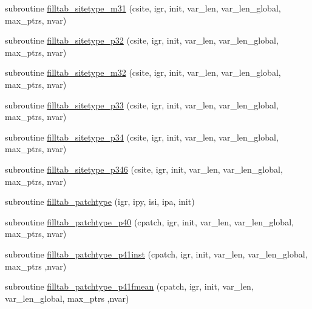 \begin{DoxyCompactItemize}
\item 
subroutine \hyperlink{namespaceed__state__vars_aeda801ceb00e5700d0dc3175a0937d16}{filltab\+\_\+sitetype\+\_\+m31} (csite, igr, init, var\+\_\+len, var\+\_\+len\+\_\+global, max\+\_\+ptrs, nvar)
\item 
subroutine \hyperlink{namespaceed__state__vars_a42452cec3810c62dd8c72e2d58476bcd}{filltab\+\_\+sitetype\+\_\+p32} (csite, igr, init, var\+\_\+len, var\+\_\+len\+\_\+global, max\+\_\+ptrs, nvar)
\item 
subroutine \hyperlink{namespaceed__state__vars_a6f5ed492902141d24d2bd008dd7b68c1}{filltab\+\_\+sitetype\+\_\+m32} (csite, igr, init, var\+\_\+len, var\+\_\+len\+\_\+global, max\+\_\+ptrs, nvar)
\item 
subroutine \hyperlink{namespaceed__state__vars_ae53d37359e4395c526fd65a95f76c428}{filltab\+\_\+sitetype\+\_\+p33} (csite, igr, init, var\+\_\+len, var\+\_\+len\+\_\+global, max\+\_\+ptrs, nvar)
\item 
subroutine \hyperlink{namespaceed__state__vars_acf64db19aff9106beb2c20eecbe6afa9}{filltab\+\_\+sitetype\+\_\+p34} (csite, igr, init, var\+\_\+len, var\+\_\+len\+\_\+global, max\+\_\+ptrs, nvar)
\item 
subroutine \hyperlink{namespaceed__state__vars_ad66c156887d39c17d4cb4b0895e5fe24}{filltab\+\_\+sitetype\+\_\+p346} (csite, igr, init, var\+\_\+len, var\+\_\+len\+\_\+global, max\+\_\+ptrs, nvar)
\item 
subroutine \hyperlink{namespaceed__state__vars_ac37a860383b752e5263aa945c99824a9}{filltab\+\_\+patchtype} (igr, ipy, isi, ipa, init)
\item 
subroutine \hyperlink{namespaceed__state__vars_a83c0921d462c47a37c8d6f97dbdb9d72}{filltab\+\_\+patchtype\+\_\+p40} (cpatch, igr, init, var\+\_\+len, var\+\_\+len\+\_\+global, max\+\_\+ptrs, nvar)
\item 
subroutine \hyperlink{namespaceed__state__vars_aaabc9ebf2bd84a36b30887405edca948}{filltab\+\_\+patchtype\+\_\+p41inst} (cpatch, igr, init, var\+\_\+len, var\+\_\+len\+\_\+global, max\+\_\+ptrs                                                                                                                                                                   ,nvar)
\item 
subroutine \hyperlink{namespaceed__state__vars_a308bf007a232ca65383f36dd6fbd0084}{filltab\+\_\+patchtype\+\_\+p41fmean} (cpatch, igr, init, var\+\_\+len, var\+\_\+len\+\_\+global, max\+\_\+ptrs                                                                                                                                                                   ,nvar)

\end{DoxyCompactItemize}
